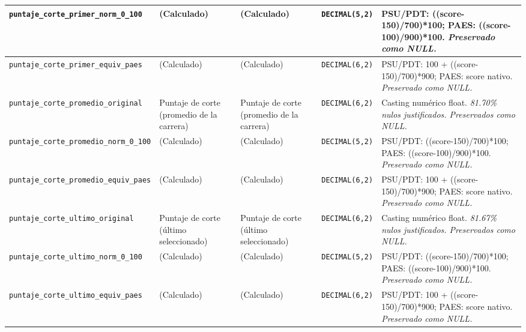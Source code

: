 {\begin{longtable}{|p{3.0cm}|p{2.0cm}|p{2.0cm}|p{1.6cm}|p{6.4cm}|}
\hline
\texttt{\footnotesize puntaje\_corte\_primer\_norm\_0\_100} & (Calculado) & (Calculado) & \texttt{\footnotesize DECIMAL(5,2)} & PSU/PDT: ((score-150)/700)*100; PAES: ((score-100)/900)*100. \newline \textit{\footnotesize Preservado como NULL.} \\
\hline
\texttt{\footnotesize puntaje\_corte\_primer\_equiv\_paes} & (Calculado) & (Calculado) & \texttt{\footnotesize DECIMAL(6,2)} & PSU/PDT: 100 + ((score-150)/700)*900; PAES: score nativo. \newline \textit{\footnotesize Preservado como NULL.} \\
\hline
\texttt{\footnotesize puntaje\_corte\_promedio\_original} & Puntaje de corte (promedio de la carrera) & Puntaje de corte (promedio de la carrera) & \texttt{\footnotesize DECIMAL(6,2)} & Casting numérico float. \newline \textit{\footnotesize 81.70\% nulos justificados. Preservados como NULL.} \\
\hline
\texttt{\footnotesize puntaje\_corte\_promedio\_norm\_0\_100} & (Calculado) & (Calculado) & \texttt{\footnotesize DECIMAL(5,2)} & PSU/PDT: ((score-150)/700)*100; PAES: ((score-100)/900)*100. \newline \textit{\footnotesize Preservado como NULL.} \\
\hline
\texttt{\footnotesize puntaje\_corte\_promedio\_equiv\_paes} & (Calculado) & (Calculado) & \texttt{\footnotesize DECIMAL(6,2)} & PSU/PDT: 100 + ((score-150)/700)*900; PAES: score nativo. \newline \textit{\footnotesize Preservado como NULL.} \\
\hline
\texttt{\footnotesize puntaje\_corte\_ultimo\_original} & Puntaje de corte (último seleccionado) & Puntaje de corte (último seleccionado) & \texttt{\footnotesize DECIMAL(6,2)} & Casting numérico float. \newline \textit{\footnotesize 81.67\% nulos justificados. Preservados como NULL.} \\
\hline
\texttt{\footnotesize puntaje\_corte\_ultimo\_norm\_0\_100} & (Calculado) & (Calculado) & \texttt{\footnotesize DECIMAL(5,2)} & PSU/PDT: ((score-150)/700)*100; PAES: ((score-100)/900)*100. \newline \textit{\footnotesize Preservado como NULL.} \\
\hline
\texttt{\footnotesize puntaje\_corte\_ultimo\_equiv\_paes} & (Calculado) & (Calculado) & \texttt{\footnotesize DECIMAL(6,2)} & PSU/PDT: 100 + ((score-150)/700)*900; PAES: score nativo. \newline \textit{\footnotesize Preservado como NULL.} \\

\end{longtable}}
